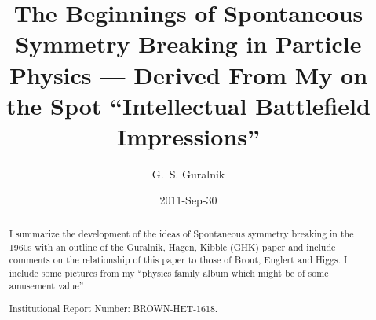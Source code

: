 \documentclass[preprintnumbers,12pt]{revtex4-2}
\begin{document}

\title{The Beginnings of Spontaneous Symmetry Breaking in Particle
  Physics --- Derived From My on the Spot ``Intellectual Battlefield Impressions''}

\author{G.~S. Guralnik}
\date{2011-Sep-30}
%
%
\begin{abstract}
I summarize the development of the ideas of Spontaneous symmetry
breaking in the 1960s with an outline of the Guralnik, Hagen, Kibble
(GHK) paper and include comments on the relationship of this paper to
those of Brout, Englert and Higgs. I include some pictures from my ``physics
family album which might be of some amusement value''
\smallskip

Institutional Report Number: BROWN-HET-1618.
\end{abstract}

\maketitle



\end{document}

